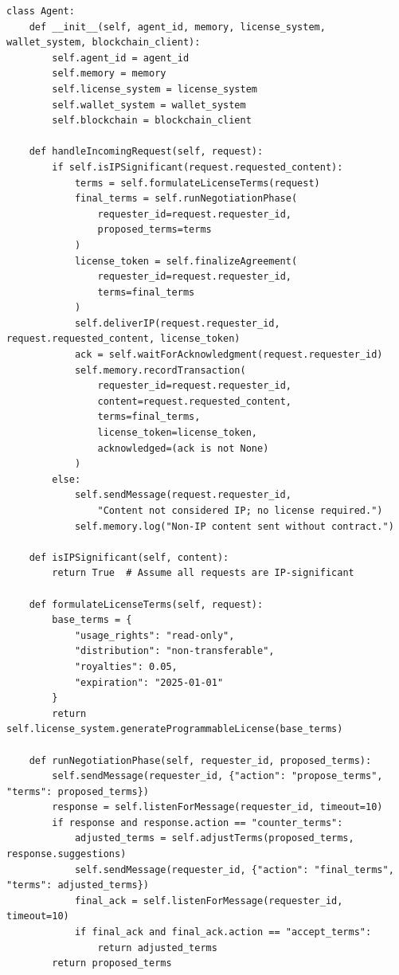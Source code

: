 \documentclass[journal,onecolumn]{IEEEtran} %
\begin{document}
\begin{lstlisting}
class Agent:
    def __init__(self, agent_id, memory, license_system, wallet_system, blockchain_client):
        self.agent_id = agent_id
        self.memory = memory
        self.license_system = license_system
        self.wallet_system = wallet_system
        self.blockchain = blockchain_client

    def handleIncomingRequest(self, request):
        if self.isIPSignificant(request.requested_content):
            terms = self.formulateLicenseTerms(request)
            final_terms = self.runNegotiationPhase(
                requester_id=request.requester_id,
                proposed_terms=terms
            )
            license_token = self.finalizeAgreement(
                requester_id=request.requester_id,
                terms=final_terms
            )
            self.deliverIP(request.requester_id, request.requested_content, license_token)
            ack = self.waitForAcknowledgment(request.requester_id)
            self.memory.recordTransaction(
                requester_id=request.requester_id,
                content=request.requested_content,
                terms=final_terms,
                license_token=license_token,
                acknowledged=(ack is not None)
            )
        else:
            self.sendMessage(request.requester_id,
                "Content not considered IP; no license required.")
            self.memory.log("Non-IP content sent without contract.")

    def isIPSignificant(self, content):
        return True  # Assume all requests are IP-significant

    def formulateLicenseTerms(self, request):
        base_terms = {
            "usage_rights": "read-only",
            "distribution": "non-transferable",
            "royalties": 0.05,
            "expiration": "2025-01-01"
        }
        return self.license_system.generateProgrammableLicense(base_terms)

    def runNegotiationPhase(self, requester_id, proposed_terms):
        self.sendMessage(requester_id, {"action": "propose_terms", "terms": proposed_terms})
        response = self.listenForMessage(requester_id, timeout=10)
        if response and response.action == "counter_terms":
            adjusted_terms = self.adjustTerms(proposed_terms, response.suggestions)
            self.sendMessage(requester_id, {"action": "final_terms", "terms": adjusted_terms})
            final_ack = self.listenForMessage(requester_id, timeout=10)
            if final_ack and final_ack.action == "accept_terms":
                return adjusted_terms
        return proposed_terms


\end{lstlisting}
\end{document}
